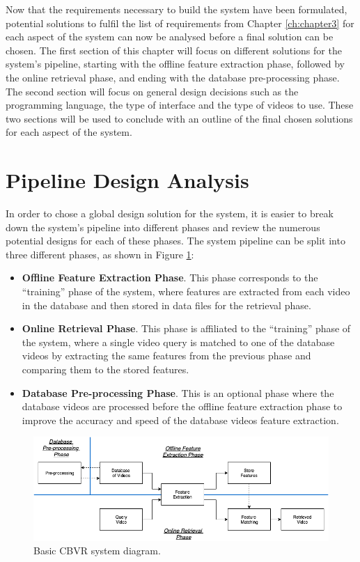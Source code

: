 Now that the requirements necessary to build the system have been formulated, potential solutions to fulfil the list of requirements from Chapter \ref{ch:chapter3} for each aspect of the system can now be analysed before a final solution can be chosen. The first section of this chapter will focus on different solutions for the system's pipeline, starting with the offline feature extraction phase, followed by the online retrieval phase, and ending with the database pre-processing phase. The second section will focus on general design decisions such as the programming language, the type of interface and the type of videos to use. These two sections will be used to conclude with an outline of the final chosen solutions for each aspect of the system.

\section{Pipeline Design Analysis}

In order to chose a global design solution for the system, it is easier to break down the system's pipeline into different phases and review the numerous potential designs for each of these phases. The system pipeline can be split into three different phases, as shown in Figure \ref{fig:basic-cbvr-diagram}:

\begin{itemize}
    \item \textbf{Offline Feature Extraction Phase}. This phase corresponds to the ``training'' phase of the system, where features are extracted from each video in the database and then stored in data files for the retrieval phase.
    \item \textbf{Online Retrieval Phase}. This phase is affiliated to the ``training'' phase of the system, where a single video query is matched to one of the database videos by extracting the same features from the previous phase and comparing them to the stored features.
    \item \textbf{Database Pre-processing Phase}. This is an optional phase where the database videos are processed before the offline feature extraction phase to improve the accuracy and speed of the database videos feature extraction.
\end{itemize}

\begin{figure}[h]
\centerline{\includegraphics[width=\textwidth]{figures/design/basic_cbvr_phases.png}}
\caption{\label{fig:basic-cbvr-diagram}Basic CBVR system diagram.}
\end{figure}

